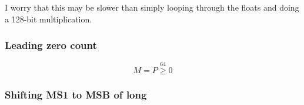 \documentclass[12pt]{article}
\begin{document}
    I worry that this may be slower than simply looping through the floats and doing a 128-bit multiplication.

    \subsubsection{Leading zero count}

    \[M = P \stackrel{64}{\geq} 0\]

    \subsubsection{Shifting MS1 to MSB of long}
\end{document}
